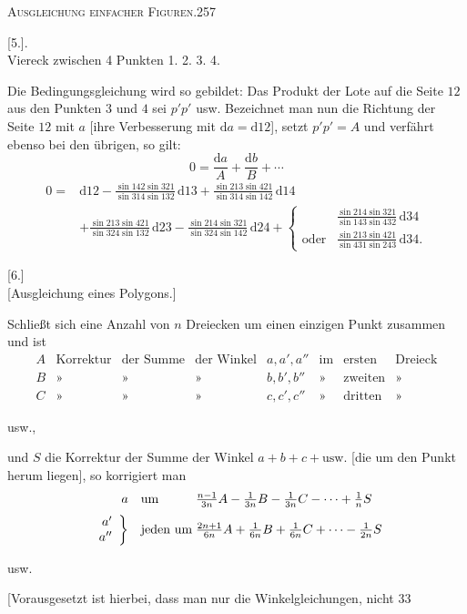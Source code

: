 \clearpage
\noindent\mbox{}\hfill\textsc{Ausgleichung einfacher Figuren.}\hfill257\par\medskip
\begin{center}[5.]\hspace{.5em}.\\[5pt]Viereck zwischen 4 Punkten 1. 2. 3. 4.\end{center}
Die Bedingungsgleichung wird so gebildet: Das Produkt der Lote auf die Seite $12$ aus den Punkten $3$ und $4$ sei $p'p'$ usw. Bezeichnet man nun die Richtung der Seite $12$ mit $a$ [ihre Verbesserung mit $\mathrm da=\mathrm d12$], setzt $p'p'=A$ und verfährt ebenso bei den übrigen, so gilt:
\[
0=\frac{\mathrm da}A+\frac{\mathrm db}B+\cdots
\]
\noindent[oder]
\[
\begin{aligned}
0={}&\mathrm d12-\tfrac{\sin142\sin321}{\sin314\sin132}\,\mathrm d13+\tfrac{\sin213\sin421}{\sin314\sin142}\,\mathrm d14\\
&+\tfrac{\sin213\sin421}{\sin324\sin132}\,\mathrm d23-\tfrac{\sin214\sin321}{\sin324\sin142}\,\mathrm d24
+\left\{\begin{array}{cl}
&\tfrac{\sin214\sin321}{\sin143\sin432}\,\mathrm d34\\[5pt]
\text{oder}&\tfrac{\sin213\sin421}{\sin431\sin243}\,\mathrm d34.
\end{array}\right.
\end{aligned}
\]
\bigskip
\begin{center}[6.]\\[5pt][Ausgleichung eines Polygons.]\end{center}
Schließt sich eine Anzahl von $n$ Dreiecken um einen einzigen Punkt zusammen und ist
\[
\begin{array}{rlllllll}
A&\text{Korrektur}&\text{der Summe}&\text{der Winkel}&a,a',a''&\text{im}&\text{ersten}&\text{Dreieck}\\
B&\text{»}&\text{»}&\text{»}&b,b',b''&\text{»}&\text{zweiten}&\text{»}\\
C&\text{»}&\text{»}&\text{»}&c,c',c''&\text{»}&\text{dritten}&\text{»}
\end{array}
\]
\begin{center}usw.,\end{center}
und $S$ die Korrektur der Summe der Winkel $a+b+c+\text{usw.}$ [die um den Punkt herum liegen], so korrigiert man
\[
\begin{array}{r@{\quad}l@{\;}l}
a&\text{um}&\tfrac{n-1}{3n}A-\tfrac1{3n}B-\tfrac1{3n}C-\cdots+\tfrac1nS\\[6pt]
\left.\begin{array}{r}a'\\a''\end{array}\right\}&\text{jeden um}&\tfrac{2n+1}{6n}A+\tfrac1{6n}B+\tfrac1{6n}C+\cdots-\tfrac1{2n}S
\end{array}
\]
\begin{center}usw.\end{center}
[Vorausgesetzt ist hierbei, dass man nur die Winkelgleichungen, nicht
\vfill{}\hfill33

